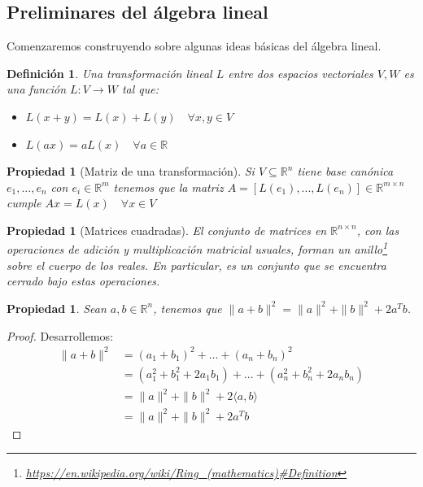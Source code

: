 \documentclass[ twoside,openright,titlepage,numbers=noenddot,%
                headinclude,footinclude,cleardoublepage=empty,abstract=on,
                BCOR=-5mm,paper=a4,fontsize=11pt
                ]{scrreprt}
\newtheorem{definition}[theorem]{Definición}
\newtheorem{property}[theorem]{Propiedad}
\newcommand{\R}{\mathbb{R}}
\begin{document}
\hypertarget{sec:linearalg-prelim}{%
\subsection{Preliminares del álgebra
lineal}\label{sec:linearalg-prelim}}

Comenzaremos construyendo sobre algunas ideas básicas del álgebra
lineal.

\begin{definition}Una transformación lineal \(L\) entre dos espacios
vectoriales \(V, W\) es una función \(L : V \rightarrow W\) tal que:
\bigbreak

\begin{itemize}
  \item $L(x + y) = L(x) + L(y) \quad \forall x, y \in V$
  \item $L(ax) = aL(x) \quad \forall a \in \R$
\end{itemize}

\end{definition}

\begin{property}[Matriz de una transformación]Si \(V \subseteq \R^n\)
tiene base canónica \(e_1, ..., e_n\) con \(e_i \in \R^m\) tenemos que
la matriz \(A = [L(e_1), ..., L(e_n)] \in \R^{m \times n}\) cumple
\(Ax = L(x) \quad \forall x \in V\)\end{property}

\begin{property}[Matrices cuadradas]El conjunto de matrices en
\(\R^{n\times n}\), con las operaciones de adición y multiplicación
matricial usuales, forman un anillo\footnote{\url{https://en.wikipedia.org/wiki/Ring_(mathematics)\#Definition}}
sobre el cuerpo de los reales. En particular, es un conjunto que se
encuentra cerrado bajo estas operaciones.\end{property}

\begin{property}\label{rmk:sqnormofsum}Sean \(a, b \in \R^n\), tenemos
que \(\| a + b \| ^ 2 = \|a\|^2 + \|b\|^2 + 2 a^T b\).\end{property}

\begin{proof}Desarrollemos: \begin{align}
\| a + b \| ^ 2 &= (a_1 + b_1)^2 + \dots + (a_n + b_n)^2 \\
&= (a_1^2 + b_1^2 + 2 a_1 b_1) + ... + (a_n^2 + b_n^2 + 2 a_n b_n) \\
&= \| a \| ^2 + \| b \|^2 + 2 \langle a, b \rangle \\
&= \| a \| ^2 + \| b \|^2 + 2 a^T b
\end{align}\end{proof}
\end{document}
